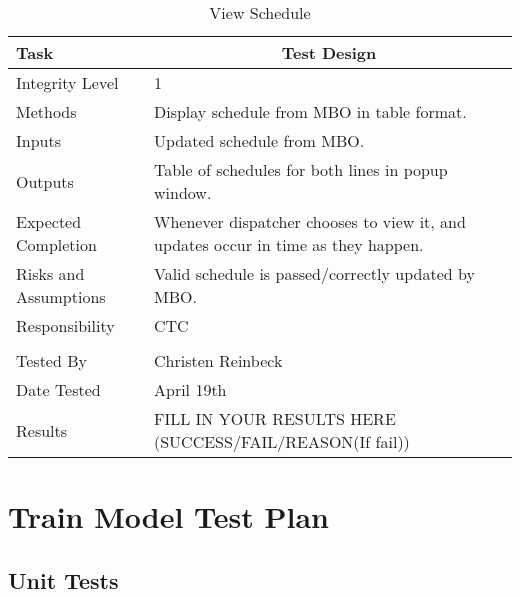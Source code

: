 \documentclass[]{article}
\begin{document}
\begin{table}[H]
	\centering
	\caption{View Schedule}
	\begin{tabular}{|l|l|}
		\hline
		Task & \multicolumn{1}{c|}{Test Design} \\ \hline
		Integrity Level & 1 \\ \hline
		Methods & Display schedule from MBO in table format.\\ \hline
		Inputs &  Updated schedule from MBO. \\ \hline
		Outputs &  Table of schedules for both lines in popup window. \\ \hline
		Expected Completion & \parbox[t]{10cm}{Whenever dispatcher chooses to view it, and updates occur in time as they happen.}\\ \hline
		Risks and Assumptions & \parbox[t]{10cm}{Valid schedule is passed/correctly updated by MBO.} \\ \hline
		Responsibility & CTC\\ \hline
		\\ \hline
		Tested By   &  Christen Reinbeck\\	\hline
		Date Tested & \parbox[t]{10cm}{April 19th}\\ \hline
		Results & FILL IN YOUR RESULTS HERE (SUCCESS/FAIL/REASON(If fail))\\ \hline
	\end{tabular}
\end{table}

\section{Train Model Test Plan}
\subsection{Unit Tests}
 
\end{document}
